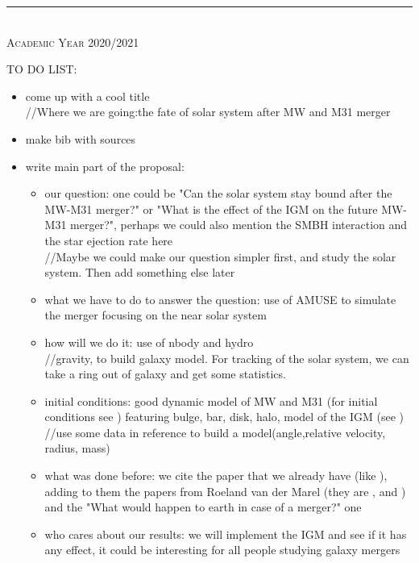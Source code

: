 \documentclass[11pt, english]{article}
\begin{document}
\begin{titlepage}
\begin{center}
\rule{125mm}{0.1mm} \\
\vspace{5pt}
\scshape{\large{Academic Year 2020/2021}} \\

\end{center}
\makeatother
\end{titlepage}


TO DO LIST:
\begin{itemize}
    \item come up with a cool title\\
    //Where we are going:the fate of solar system after MW and M31 merger
    \item make bib with sources
    \item write main part of the proposal:
    \begin{itemize}
        \item our question: one could be "Can the solar system stay bound after the MW-M31 merger?" or "What is the effect of the IGM on the future MW-M31 merger?", perhaps we could also mention the SMBH interaction and the star ejection rate here \\
        //Maybe we could make our question simpler first, and study the solar system. Then add something else later
        \item what we have to do to answer the question: use of AMUSE to simulate the merger focusing on the near solar system
        \item how will we do it: use of nbody and hydro\\
        //gravity, to build galaxy model. For tracking of the solar system, we can take a ring out of galaxy and get some statistics.
        \item initial conditions: good dynamic model of MW and M31 (for initial conditions see \textcite{van_der_Marel_2019}) featuring bulge, bar, disk, halo, model of the IGM (see \textcite{Lehner_2020}) \\
        //use some data in reference to build a model(angle,relative velocity, radius, mass)
        \item what was done before: we cite the paper that we already have (like \textcite{Schiavi_2019}), adding to them the papers from Roeland van der Marel (they are \textcite{Sohn_2012}, \textcite{van_der_Marel_2012} and \textcite{van_der_Marel_2012b}) and the "What would happen to earth in case of a merger?" one
        \item who cares about our results: we will implement the IGM and see if it has any effect, it could be interesting for all people studying galaxy mergers

\end{itemize}
\end{itemize}
\end{document}
